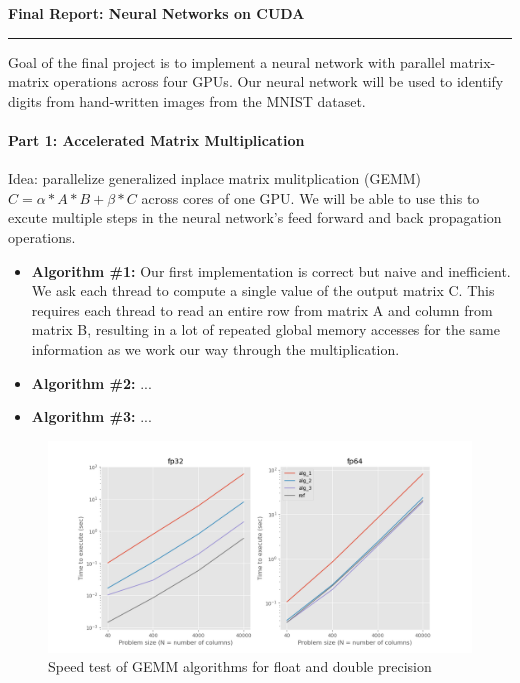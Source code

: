 \documentclass[12pt,letterpaper,twoside]{article}
\begin{document}
{\centering \textbf{Final Report: Neural Networks on CUDA\\}}
\vspace*{-8pt}\noindent\rule{\linewidth}{1pt}

Goal of the final project is to implement a neural network with parallel 
matrix-matrix operations across four GPUs. Our neural network will be used
to identify digits from hand-written images from the MNIST dataset.

\paragraph{Part 1: Accelerated Matrix Multiplication} Idea: parallelize generalized
inplace matrix mulitplication (GEMM) $C = \alpha*A*B + \beta*C$ across cores of one GPU. We 
will be able to use this to excute multiple steps in the neural network's feed forward 
and back propagation operations.

\begin{itemize}
    \item \textbf{Algorithm \#1:} Our first implementation is correct but naive and 
    inefficient. We ask each thread to compute a single value of the output matrix 
    C. This requires each thread to read an entire row from matrix A and column from 
    matrix B, resulting in a lot of repeated global memory accesses for the same 
    information as we work our way through the multiplication. 

    \item \textbf{Algorithm \#2:} ...

    \item \textbf{Algorithm \#3: } ...

\end{itemize}

\begin{figure}[!htbp]
    \centering
    \includegraphics[scale=0.6]{speed_alg_vs_problem_size.png}
    \caption{Speed test of GEMM algorithms for float and double precision}
\end{figure}
\end{document}
